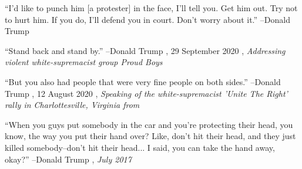 \documentclass{article}%
\begin{document}
\linebreak%
\vspace{1mm}%
\begin{minipage}{\textwidth}%
\flushleft%
“I'd like to punch him {[}a protester{]} in the face, I'll tell you. Get him out. Try not to hurt him. If you do, I'll defend you in court. Don't worry about it.”%
\linebreak%
\vspace{1mm}%
–Donald Trump%
\linebreak%
\vspace{1mm}%
\end{minipage}%
\linebreak%
\vspace{1mm}%
\begin{minipage}{\textwidth}%
\flushleft%
“Stand back and stand by.”%
\linebreak%
\vspace{1mm}%
–Donald Trump%
, 29 September 2020%
, \textit{Addressing violent white-supremacist group Proud Boys}%
\linebreak%
\vspace{1mm}%
\end{minipage}%
\linebreak%
\vspace{1mm}%
\begin{minipage}{\textwidth}%
\flushleft%
“But you also had people that were very fine people on both sides.”%
\linebreak%
\vspace{1mm}%
–Donald Trump%
, 12 August 2020%
, \textit{Speaking of the white-supremacist 'Unite The Right' rally in Charlottesville, Virginia from}%
\linebreak%
\vspace{1mm}%
\end{minipage}%
\linebreak%
\vspace{1mm}%
\begin{minipage}{\textwidth}%
\flushleft%
“When you guys put somebody in the car and you're protecting their head, you know, the way you put their hand over? Like, don't hit their head, and they just killed somebody–don't hit their head... I said, you can take the hand away, okay?”%
\linebreak%
\vspace{1mm}%
–Donald Trump%
, \textit{July 2017}%
\linebreak%
\vspace{1mm}%
\end{minipage}%
\end{document}
